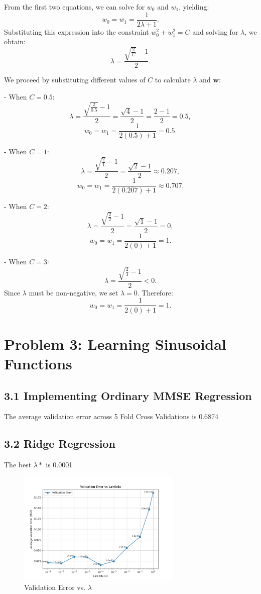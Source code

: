 \documentclass[12pt]{article}
\begin{document}
From the first two equations, we can solve for \( w_0 \) and \( w_1 \), yielding:
\[
w_0 = w_1 = \frac{1}{2\lambda + 1}.
\]
Substituting this expression into the constraint \( w_0^2 + w_1^2 = C \) and solving for \( \lambda \), we obtain:
\[
\lambda = \frac{\sqrt{\frac{2}{C}} - 1}{2}.
\]

We proceed by substituting different values of \( C \) to calculate \( \lambda \) and \( \mathbf{w} \):

- When \( C = 0.5 \):
\[
\lambda = \frac{\sqrt{\frac{2}{0.5}} - 1}{2} = \frac{\sqrt{4} - 1}{2} = \frac{2 - 1}{2} = 0.5,
\]
\[
w_0 = w_1 = \frac{1}{2(0.5) + 1} = 0.5.
\]

- When \( C = 1 \):
\[
\lambda = \frac{\sqrt{\frac{2}{1}} - 1}{2} = \frac{\sqrt{2} - 1}{2} \approx 0.207,
\]
\[
w_0 = w_1 = \frac{1}{2(0.207) + 1} \approx 0.707.
\]

- When \( C = 2 \):
\[
\lambda = \frac{\sqrt{\frac{2}{2}} - 1}{2} = \frac{\sqrt{1} - 1}{2} = 0,
\]
\[
w_0 = w_1 = \frac{1}{2(0) + 1} = 1.
\]

- When \( C = 3 \):
\[
\lambda = \frac{\sqrt{\frac{2}{3}} - 1}{2} < 0.
\]
Since \( \lambda \) must be non-negative, we set \( \lambda = 0 \). Therefore:
\[
w_0 = w_1 = \frac{1}{2(0) + 1} = 1.
\]

\section*{Problem 3: Learning Sinusoidal Functions}

\subsection*{3.1 Implementing Ordinary MMSE Regression}
The average validation error across 5 Fold Cross Validations is 0.6874

\subsection*{3.2 Ridge Regression}
The best $\lambda*$ is 0.0001

\begin{figure}[H]
    \centering
    \includegraphics[width=0.7\textwidth]{ridge_regression_plot.png}
    \caption{Validation Error vs. \( \lambda \)}
\end{figure}
\end{document}
